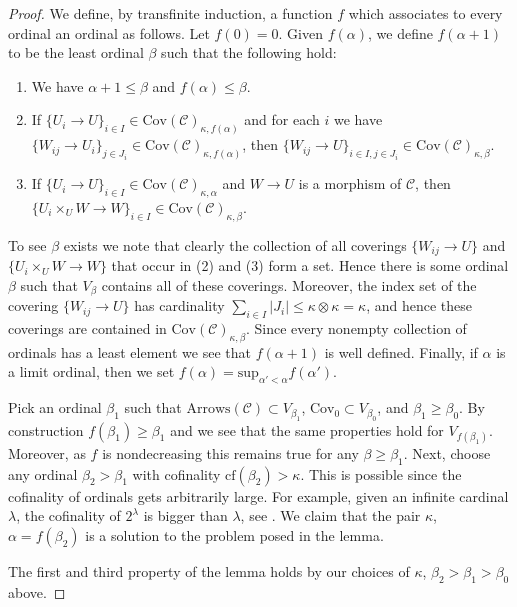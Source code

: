 \begin{proof}
\medskip\noindent
We define, by transfinite induction, a function $f$ which associates
to every ordinal an ordinal as follows. Let $f(0) = 0$.
Given $f(\alpha)$, we define $f(\alpha + 1)$ to be the least
ordinal $\beta$ such that the following hold:
\begin{enumerate}
\item We have $\alpha + 1 \leq \beta$ and $f(\alpha) \leq \beta$.
\item If $\{U_i \to U\}_{i\in I}
\in \text{Cov}(\mathcal{C})_{\kappa, f(\alpha)}$
and for each $i$ we have
$\{W_{ij} \to U_i\}_{j\in J_i}
\in \text{Cov}(\mathcal{C})_{\kappa, f(\alpha)}$,
then
$\{W_{ij} \to U\}_{i \in I, j\in J_i}
\in \text{Cov}(\mathcal{C})_{\kappa, \beta}$.
\item If $\{U_i \to U\}_{i\in I}
\in \text{Cov}(\mathcal{C})_{\kappa, \alpha}$
and $W \to U$ is a morphism of $\mathcal{C}$, then
$\{U_i \times_U W \to W \}_{i\in I}
\in \text{Cov}(\mathcal{C})_{\kappa, \beta}$.
\end{enumerate}
To see $\beta$ exists we note that clearly the collection of all
coverings $\{W_{ij} \to U\}$ and $\{U_i \times_U W \to W \}$ that occur in
(2) and (3) form a set. Hence there is some ordinal $\beta$ such that
$V_\beta$ contains all of these coverings. Moreover, the index set
of the covering $\{W_{ij} \to U\}$ has cardinality
$\sum_{i \in I} |J_i| \leq \kappa \otimes \kappa = \kappa$, and
hence these coverings are contained in
$\text{Cov}(\mathcal{C})_{\kappa, \beta}$.
Since every nonempty collection of ordinals has a least element
we see that $f(\alpha + 1)$ is well defined. Finally, if $\alpha$
is a limit ordinal, then we set
$f(\alpha) = \text{sup}_{\alpha' < \alpha} f(\alpha')$.

\medskip\noindent
Pick an ordinal $\beta_1$ such that
$\text{Arrows}(\mathcal{C}) \subset V_{\beta_1}$,
$\text{Cov}_0 \subset V_{\beta_0}$,
and $\beta_1 \geq \beta_0$.
By construction $f(\beta_1) \geq \beta_1$ and we see that
the same properties hold for $V_{f(\beta_1)}$. Moreover, as $f$ is
nondecreasing this remains true for any $\beta \geq \beta_1$.
Next, choose any ordinal $\beta_2 > \beta_1$ with
cofinality $\text{cf}(\beta_2) > \kappa$. This is possible
since the cofinality of ordinals gets arbitrarily large.
For example, given an infinite cardinal $\lambda$,
the cofinality of $2^\lambda$ is bigger than $\lambda$, see
\cite[Chapter I, Corollary 10.41]{Kunen}. 
We claim that the pair $\kappa$,
$\alpha = f(\beta_2)$ is a solution to the problem posed in the lemma.

\medskip\noindent
The first and third property of the lemma holds by our choices
of $\kappa$, $\beta_2 > \beta_1 > \beta_0$ above.


\end{proof}
